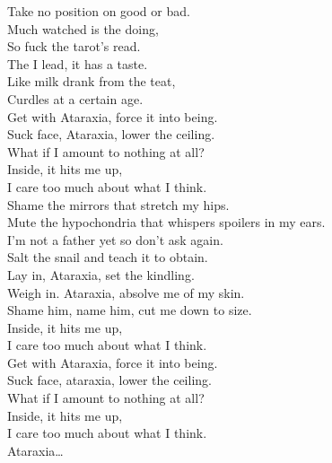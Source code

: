 



Take no position on good or bad. \\
Much watched is the doing, \\
So fuck the tarot's read. \\
The  I lead, it has a taste. \\
Like milk drank from the teat, \\
Curdles at a certain age. \\

Get with Ataraxia, force it into being. \\
Suck face, Ataraxia, lower the ceiling. \\
What if I amount to nothing at all? \\
Inside, it hits me up, \\
I care too much about what I think. \\

Shame the mirrors that stretch my hips. \\
Mute the hypochondria that whispers spoilers in my ears. \\
I'm not a father yet so don't ask again. \\
Salt the snail and teach it to obtain. \\

Lay in, Ataraxia, set the kindling. \\
Weigh in. Ataraxia, absolve me of my skin. \\
Shame him, name him, cut me down to size. \\
Inside, it hits me up, \\
I care too much about what I think. \\

Get with Ataraxia, force it into being. \\
Suck face, ataraxia, lower the ceiling. \\
What if I amount to nothing at all? \\
Inside, it hits me up, \\
I care too much about what I think. \\

Ataraxia… \\


